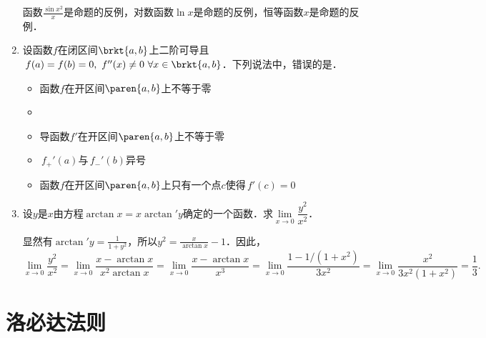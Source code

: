 \begin{enumerate}
  \ifshowsol
    函数\(\frac{\sin x^2}{x}\)是命题的反例，对数函数\(\ln x\)是命题的反例，恒等函数\(x\)是命题的反例．
  \fi

\item 设函数\(f\)在闭区间\(\brkt{a,b}\)上二阶可导且\(\,f(a) = f(b) = 0,\ f\dpr(x) \ne 0\ \forall x \in \brkt{a,b}\)．下列说法中，错误的是\uline{\hspace{8em}}．
  \begin{itemize}
    \renewcommand{\labelitemi}{\faCircleThin}
  \item 函数\(f\)在开区间\(\paren{a,b}\)上不等于零
    \ifshowsol
    \item[\faCircle]
    \else
    \item
    \fi
    导函数\(f'\!\)在开区间\(\paren{a,b}\)上不等于零
  \item \(\,f_+'(a)\)与\(\,f_-'(b)\)异号
  \item 函数\(f\)在开区间\(\paren{a,b}\)上只有一个点\(c\)使得\(\,f'(c) = 0\)
  \end{itemize}

\item 设\(y\)是\(x\)由方程\(\arctan x = x \arctan' y\)确定的一个函数．求\(\lim\limits_{x\to0} \dfrac{y^2}{x^2}\)．

  \ifshowsol
    显然有\(\arctan' y = \frac{1}{1+y^2}\)，所以\(y^2 = \frac{x}{\arctan x} - 1\)．因此，
    \begin{equation*}
      \lim_{x\to0} \frac{y^2}{x^2}
      = \lim_{x\to0} \frac{x-\arctan x}{x^2 \arctan x}
      = \lim_{x\to0} \frac{x-\arctan x}{x^3}
      = \lim_{x\to0} \frac{1-1/(1+x^2)}{3x^2}
      = \lim_{x\to0} \frac{x^2}{3x^2(1+x^2)}
      = \frac13.
    \end{equation*}
  \fi
\end{enumerate}
\fi

\section{洛必达法则}

